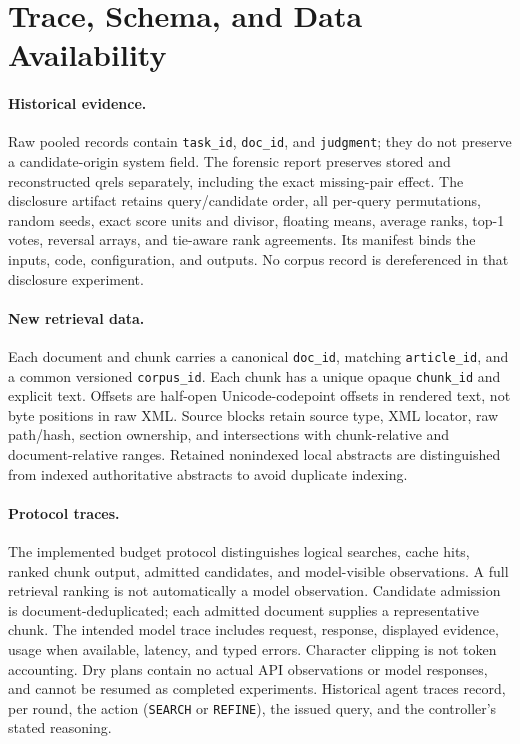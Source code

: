\section{Trace, Schema, and Data Availability}
\label{app:trace}
\paragraph{Historical evidence.}
Raw pooled records contain \texttt{task\_id}, \texttt{doc\_id}, and \texttt{judgment}; they do not preserve a candidate-origin system field. The forensic report preserves stored and reconstructed qrels separately, including the exact missing-pair effect. The disclosure artifact retains query/candidate order, all per-query permutations, random seeds, exact score units and divisor, floating means, average ranks, top-1 votes, reversal arrays, and tie-aware rank agreements. Its manifest binds the inputs, code, configuration, and outputs. No corpus record is dereferenced in that disclosure experiment.

\paragraph{New retrieval data.}
Each document and chunk carries a canonical \texttt{doc\_id}, matching \texttt{article\_id}, and a common versioned \texttt{corpus\_id}. Each chunk has a unique opaque \texttt{chunk\_id} and explicit text. Offsets are half-open Unicode-codepoint offsets in rendered text, not byte positions in raw XML. Source blocks retain source type, XML locator, raw path/hash, section ownership, and intersections with chunk-relative and document-relative ranges. Retained nonindexed local abstracts are distinguished from indexed authoritative abstracts to avoid duplicate indexing.

\paragraph{Protocol traces.}
The implemented budget protocol distinguishes logical searches, cache hits, ranked chunk output, admitted candidates, and model-visible observations. A full retrieval ranking is not automatically a model observation. Candidate admission is document-deduplicated; each admitted document supplies a representative chunk. The intended model trace includes request, response, displayed evidence, usage when available, latency, and typed errors. Character clipping is not token accounting. Dry plans contain no actual API observations or model responses, and cannot be resumed as completed experiments. Historical agent traces record, per round, the action (\texttt{SEARCH} or \texttt{REFINE}), the issued query, and the controller's stated reasoning.

